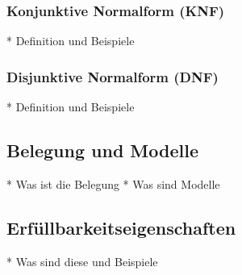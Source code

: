 \documentclass[../gruppenarbeit_1.tex]{subfiles}
\begin{document}
\subsubsection{Konjunktive Normalform (KNF)}

* Definition und Beispiele

\subsubsection{Disjunktive Normalform (DNF)}

* Definition und Beispiele

\subsection{Belegung und Modelle}

* Was ist die Belegung
* Was sind Modelle

\subsection{Erfüllbarkeitseigenschaften}

* Was sind diese und Beispiele
\end{document}
